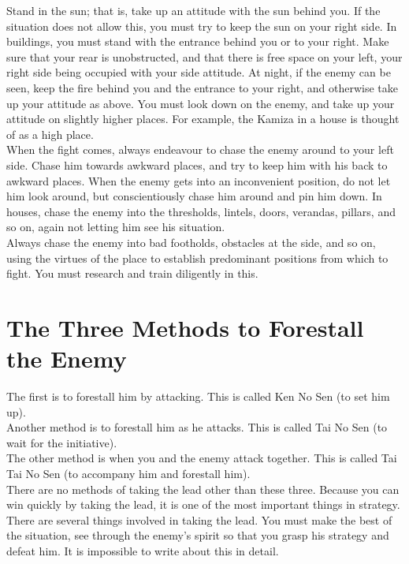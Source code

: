 Stand in the sun; that is, take up an attitude with the sun behind you. If the situation does not allow this, you must try to keep the sun on your right side. In buildings, you must stand with the entrance behind you or to your right. Make sure that your rear is unobstructed, and that there is free space on your left, your right side being occupied with your side attitude. At night, if the enemy can be seen, keep the fire behind you and the entrance to your right, and otherwise take up your attitude as above. You must look down on the enemy, and take up your attitude on slightly higher places. For example, the Kamiza in a house is thought of as a high place.\\

When the fight comes, always endeavour to chase the enemy around to your left side. Chase him towards awkward places, and try to keep him with his back to awkward places. When the enemy gets into an inconvenient position, do not let him look around, but conscientiously chase him around and pin him down. In houses, chase the enemy into the thresholds, lintels, doors, verandas, pillars, and so on, again not letting him see his situation.\\

Always chase the enemy into bad footholds, obstacles at the side, and so on, using the virtues of the place to establish predominant positions from which to fight. You must research and train diligently in this.\\
\section{The Three Methods to Forestall the Enemy}

The first is to forestall him by attacking. This is called Ken No Sen (to set him up).\\

Another method is to forestall him as he attacks. This is called Tai No Sen (to wait for the initiative).\\

The other method is when you and the enemy attack together. This is called Tai Tai No Sen (to accompany him and forestall him).\\

There are no methods of taking the lead other than these three. Because you can win quickly by taking the lead, it is one of the most important things in strategy. There are several things involved in taking the lead. You must make the best of the situation, see through the enemy's spirit so that you grasp his strategy and defeat him. It is impossible to write about this in detail.\\
